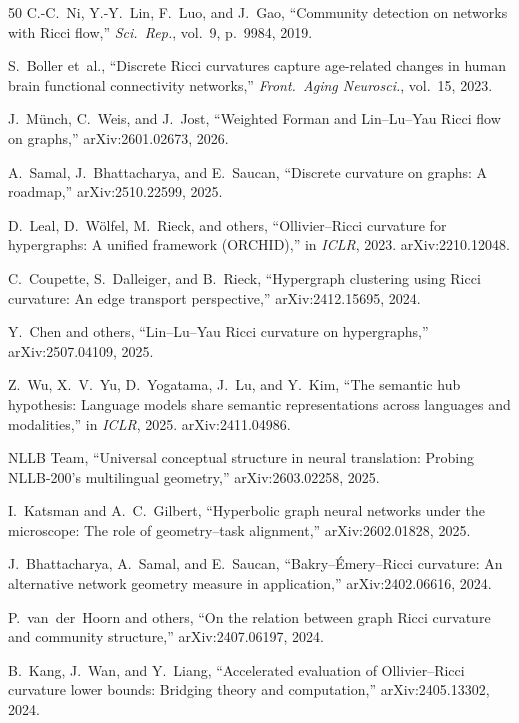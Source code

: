 \documentclass[11pt,a4paper]{article}
\begin{document}
\begin{thebibliography}{50}
C.-C.~Ni, Y.-Y.~Lin, F.~Luo, and J.~Gao, ``Community detection on networks with Ricci flow,'' \emph{Sci.~Rep.}, vol.~9, p.~9984, 2019.

S.~Boller et~al., ``Discrete Ricci curvatures capture age-related changes in human brain functional connectivity networks,'' \emph{Front.\ Aging Neurosci.}, vol.~15, 2023.

J.~M\"unch, C.~Weis, and J.~Jost, ``Weighted Forman and Lin--Lu--Yau Ricci flow on graphs,'' arXiv:2601.02673, 2026.

A.~Samal, J.~Bhattacharya, and E.~Saucan, ``Discrete curvature on graphs: A roadmap,'' arXiv:2510.22599, 2025.

D.~Leal, D.~W\"olfel, M.~Rieck, and others, ``Ollivier--Ricci curvature for hypergraphs: A unified framework (ORCHID),'' in \emph{ICLR}, 2023. arXiv:2210.12048.

C.~Coupette, S.~Dalleiger, and B.~Rieck, ``Hypergraph clustering using Ricci curvature: An edge transport perspective,'' arXiv:2412.15695, 2024.

Y.~Chen and others, ``Lin--Lu--Yau Ricci curvature on hypergraphs,'' arXiv:2507.04109, 2025.

Z.~Wu, X.~V.~Yu, D.~Yogatama, J.~Lu, and Y.~Kim, ``The semantic hub hypothesis: Language models share semantic representations across languages and modalities,'' in \emph{ICLR}, 2025. arXiv:2411.04986.

NLLB Team, ``Universal conceptual structure in neural translation: Probing NLLB-200's multilingual geometry,'' arXiv:2603.02258, 2025.

I.~Katsman and A.~C.~Gilbert, ``Hyperbolic graph neural networks under the microscope: The role of geometry--task alignment,'' arXiv:2602.01828, 2025.

J.~Bhattacharya, A.~Samal, and E.~Saucan, ``Bakry--\'Emery--Ricci curvature: An alternative network geometry measure in application,'' arXiv:2402.06616, 2024.

P.~van~der~Hoorn and others, ``On the relation between graph Ricci curvature and community structure,'' arXiv:2407.06197, 2024.

B.~Kang, J.~Wan, and Y.~Liang, ``Accelerated evaluation of Ollivier--Ricci curvature lower bounds: Bridging theory and computation,'' arXiv:2405.13302, 2024.


\end{thebibliography}
\end{document}
